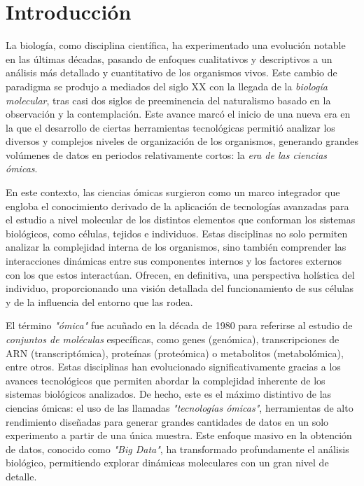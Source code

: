 \chapter{Introducción}

La biología, como disciplina científica, ha experimentado una evolución notable en las últimas décadas, 
pasando de enfoques cualitativos y descriptivos a un análisis más detallado y cuantitativo de los organismos 
vivos. Este cambio de paradigma se produjo a mediados del siglo XX con la llegada de la \textit{biología molecular},
tras casi dos siglos de preeminencia del naturalismo basado en la observación y la contemplación. 
Este avance marcó el inicio de una nueva era en la que el desarrollo de ciertas herramientas tecnológicas permitió 
analizar los diversos y complejos niveles de organización de los organismos, generando grandes volúmenes de datos 
en periodos relativamente cortos: la \textit{era de las ciencias ómicas}. \newline%

En este contexto, las ciencias ómicas surgieron como un marco integrador que engloba el conocimiento derivado 
de la aplicación de tecnologías avanzadas para el estudio a nivel molecular de los distintos elementos que 
conforman los sistemas biológicos, como células, tejidos e individuos. Estas disciplinas no solo permiten 
analizar la complejidad interna de los organismos, sino también comprender las interacciones dinámicas 
entre sus componentes internos y los factores externos con los que estos interactúan. Ofrecen, en definitiva,
una perspectiva holística del individuo, proporcionando una visión detallada del funcionamiento de sus células 
y de la influencia del entorno que las rodea. \newline%

El término \textit{"ómica"} fue acuñado en la década de 1980 para referirse al estudio de 
\textit{conjuntos de moléculas} específicas, como genes (genómica), transcripciones de ARN (transcriptómica), 
proteínas (proteómica) o metabolitos (metabolómica), entre otros. Estas disciplinas han evolucionado 
significativamente gracias a los avances tecnológicos que permiten abordar la complejidad inherente de los 
sistemas biológicos analizados. De hecho, este es el máximo distintivo de las ciencias ómicas: el uso de las 
llamadas \textit{"tecnologías ómicas"}, herramientas de alto rendimiento diseñadas para generar grandes cantidades 
de datos en un solo experimento a partir de una única muestra. Este enfoque masivo en la obtención de datos, 
conocido como \textit{"Big Data"}, ha transformado profundamente el análisis biológico, permitiendo explorar 
dinámicas moleculares con un gran nivel de detalle.\newline%


